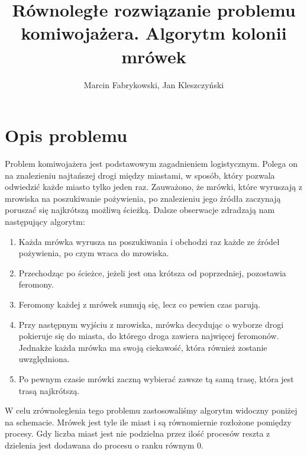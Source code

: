 \documentclass[12pt,a4paper]{article}
\title{Równoległe rozwiązanie problemu komiwojażera. Algorytm kolonii mrówek}
\author{Marcin Fabrykowski, Jan Kleszczyński}
\begin{document}
\maketitle
\newpage
\section{Opis problemu}
Problem komiwojażera jest podstawowym zagadnieniem logistycznym. Polega on na znalezieniu
najtańszej drogi między miastami, w sposób, który pozwala odwiedzić każde miasto tylko jeden raz.
Zauważono, że mrówki, które wyruszają z mrowiska na poszukiwanie pożywienia, po znalezieniu jego źródła zaczynają poruszać się najkrótszą możliwą ścieżką. Dalsze obserwacje zdradzają nam
następujący algorytm:
\begin{enumerate}
\item Każda mrówka wyrusza na poszukiwania i obchodzi raz każde ze źródeł pożywienia, po czym
wraca do mrowiska.
\item Przechodząc po ścieżce, jeżeli jest ona krótsza od poprzedniej, pozostawia feromony.
\item Feromony każdej z mrówek sumują się, lecz co pewien czas parują.
\item Przy następnym wyjściu z mrowiska, mrówka decydując o wyborze drogi pokieruje się do
miasta, do którego droga zawiera najwięcej feromonów. Jednakże każda mrówka ma swoją
ciekawość, która również zostanie uwzględniona.
\item Po pewnym czasie mrówki zaczną wybierać zawsze tą samą trasę, która jest trasą najkrótszą.
\end{enumerate}
W celu zrównoleglenia tego problemu zastosowaliśmy algorytm widoczny poniżej na schemacie.
Mrówek jest tyle ile miast i są równomiernie rozłożone pomiędzy procesy. Gdy liczba miast jest nie podzielna przez ilość procesów reszta z dzielenia jest dodawana do procesu o ranku równym 0. 
\end{document}
